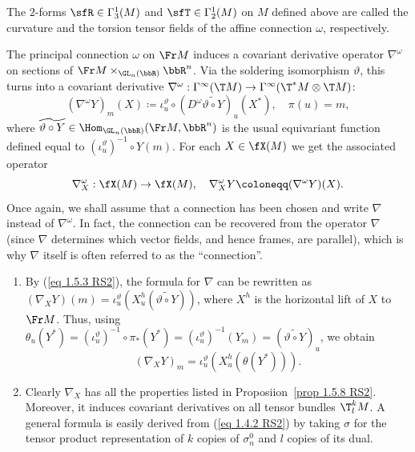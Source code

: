 \begin{defn}
    The $2$-forms $\sfR\in \Gamma_3^1(M)$ and $\sfT\in\Gamma_2^1(M)$ on $M$ defined above are called the curvature and the torsion tensor fields of the affine connection $\omega$, respectively.
\end{defn}


The principal connection $\omega$ on $\Fr M$ induces a covariant derivative operator $\nabla^\omega$ on sections of $\Fr M\times_{\GL_n(\bbR)}\bbR^n$. Via the soldering isomorphism $\vartheta$, this turns into a covariant derivative $\nabla^\omega:\Gamma^\infty(\T M)\to \Gamma^\infty(\T^\ast M\otimes \T M)$:
\[(\nabla^\omega Y)_m(X)\coloneqq \iota_u^\vartheta\circ (D^\omega \widetilde{\vartheta\circ Y})_u(X^\ast),\quad \pi(u)=m,\]
where $\widetilde{\vartheta\circ Y}\in\Hom_{\GL_n(\bbR)}(\Fr M,\bbR^n)$ is the usual equivariant function defined equal to $(\iota_u^\vartheta)^{-1}\circ Y(m)$. For each $X\in\fX(M)$ we get the associated operator
\[\nabla_X^\omega:\fX(M)\to \fX(M),\quad \nabla_X^\omega Y\coloneqq (\nabla^\omega Y)(X).\]
Once again, we shall assume that a connection has been chosen and write $\nabla$ instead of $\nabla^\omega$. In fact, the connection can be recovered from the operator $\nabla$ (since $\nabla$ determines which vector fields, and hence frames, are parallel), which is why $\nabla$ itself is often referred to as the ``connection''.

\begin{rem}\label{rem 2.1.17 RS2}
    \begin{enumerate}
        \item By (\ref{eq 1.5.3 RS2}), the formula for $\nabla$ can be rewritten as $(\nabla_X Y)(m)=\iota_u^\vartheta(X_u^h(\widetilde{\vartheta\circ Y}))$, where $X^h$ is the horizontal lift of $X$ to $\Fr M$. Thus, using $\theta_u(Y^\ast)=(\iota_u^\vartheta)^{-1}\circ\pi_\ast(Y^\ast)=(\iota_u^\vartheta)^{-1}(Y_m)=(\widetilde{\vartheta\circ Y})_u$, we obtain 
        \[(\nabla_X Y)_m=\iota_u^\vartheta(X_u^h(\theta(Y^\ast))).\label{eq 2.1.31 RS2}\]
        \item Clearly $\nabla_X$ has all the properties listed in Proposiion~\ref{prop 1.5.8 RS2}. Moreover, it induces covariant derivatives on all tensor bundles $\T^k_l M$. A general formula is easily derived from (\ref{eq 1.4.2 RS2}) by taking $\sigma$ for the tensor product representation of $k$ copies of $\sigma_n^0$ and $l$ copies of its dual.
    \end{enumerate}
\end{rem}

